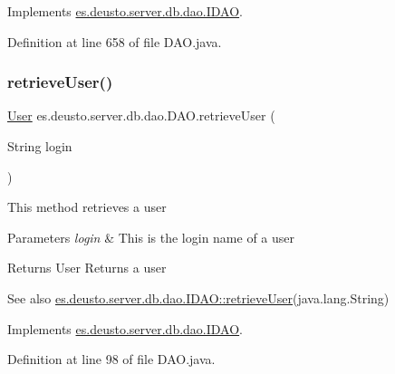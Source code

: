 Implements \hyperlink{interfacees_1_1deusto_1_1server_1_1db_1_1dao_1_1_i_d_a_o_a6a3e25055d4a81c738d1bd73de6ef7da}{es.\+deusto.\+server.\+db.\+dao.\+I\+D\+AO}.



Definition at line 658 of file D\+A\+O.\+java.

\mbox{\label{classes_1_1deusto_1_1server_1_1db_1_1dao_1_1_d_a_o_a8c316b4c3bf246d00fb2b423a603ebe6}} 
\subsubsection{\texorpdfstring{retrieve\+User()}{retrieveUser()}}
{\footnotesize\ttfamily \hyperlink{classes_1_1deusto_1_1server_1_1db_1_1data_1_1_user}{User} es.\+deusto.\+server.\+db.\+dao.\+D\+A\+O.\+retrieve\+User (\begin{DoxyParamCaption}\item[{String}]{login }\end{DoxyParamCaption})}

This method retrieves a user 
\begin{DoxyParams}{Parameters}
{\em login} & This is the login name of a user \\
\hline
\end{DoxyParams}
\begin{DoxyReturn}{Returns}
User Returns a user 
\end{DoxyReturn}
\begin{DoxySeeAlso}{See also}
\hyperlink{interfacees_1_1deusto_1_1server_1_1db_1_1dao_1_1_i_d_a_o_a19f9b0d0b6f5f80730d6d197deca7dfc}{es.\+deusto.\+server.\+db.\+dao.\+I\+D\+A\+O\+::retrieve\+User}(java.\+lang.\+String) 
\end{DoxySeeAlso}


Implements \hyperlink{interfacees_1_1deusto_1_1server_1_1db_1_1dao_1_1_i_d_a_o_a19f9b0d0b6f5f80730d6d197deca7dfc}{es.\+deusto.\+server.\+db.\+dao.\+I\+D\+AO}.



Definition at line 98 of file D\+A\+O.\+java.

\mbox{\label{classes_1_1deusto_1_1server_1_1db_1_1dao_1_1_d_a_o_a7484309d9b9b39c24cd7d0413a90c468}} 
